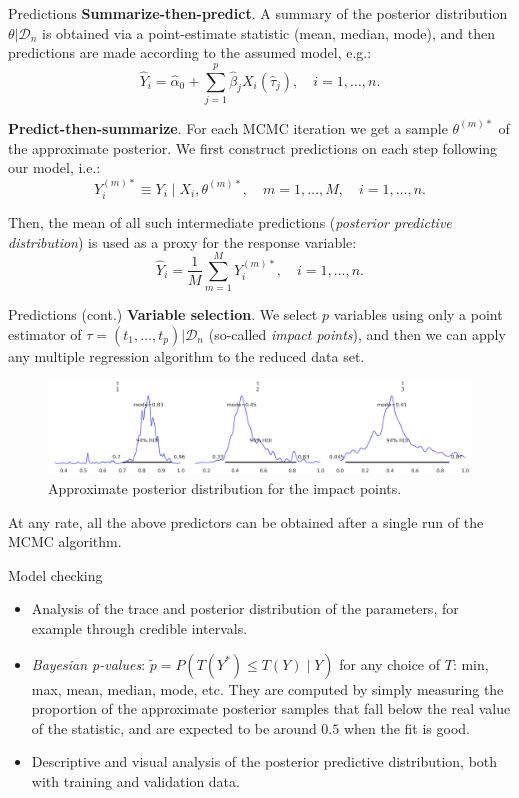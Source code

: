 \documentclass[10pt, english, professionalfonts]{beamer}
\begin{document}
\begin{frame}{Predictions}
  \textbf{Summarize-then-predict}. A summary of the posterior distribution \(\theta| \mathcal D_n\) is obtained via a point-estimate statistic (mean, median, mode), and then predictions are made according to the assumed model, e.g.:
  \[
  \hat Y_i =\hat \alpha_0 + \sum_{j=1}^p \hat \beta_j X_i(\hat \tau_j), \quad i=1,\dots, n.
  \]

  \textbf{Predict-then-summarize}. For each MCMC iteration we get a sample \(\theta^{(m)*}\) of the approximate posterior. We first construct predictions on each step following our model, i.e.:
  \[
    Y_i^{(m)*} \equiv Y_i \mid X_i, \theta^{(m)*}, \quad m=1,\dots,M, \quad i=1,\dots, n.
  \]

  Then, the mean of all such intermediate predictions (\textit{posterior predictive distribution}) is used as a proxy for the response variable:
  \[
    \hat Y_i = \frac{1}{M}\sum_{m=1}^M Y_i^{(m)*}, \quad i=1,\dots, n.
  \]

\end{frame}

\begin{frame}{Predictions (cont.)}
    \textbf{Variable selection}. We select \(p\) variables using only a point estimator of \(\tau=(t_1,\dots, t_p)|\mathcal D_n\) (so-called \textit{impact points}), and then we can apply any multiple regression algorithm to the reduced data set.
    \vspace{1em}

    \begin{figure}
      \includegraphics[width=\textwidth]{img/tau_posterior}
      \caption{Approximate posterior distribution for the impact points.}
    \end{figure}

    At any rate, all the above predictors can be obtained after a single run of the MCMC algorithm.
\end{frame}

\begin{frame}{Model checking}
  \begin{itemize}
    \item Analysis of the trace and posterior distribution of the parameters, for example through credible intervals.
    \item \textit{Bayesian p-values}: \(\tilde p=P(T(Y^*)\leq T(Y)\mid Y)\) for any choice of \(T\): min, max, mean, median, mode, etc. They are computed by simply measuring the proportion of the approximate posterior samples that fall below the real value of the statistic, and are expected to be around \(0.5\) when the fit is good.
    \item Descriptive and visual analysis of the posterior predictive distribution, both with training and validation data.
  \end{itemize}

\end{frame}
\end{document}
